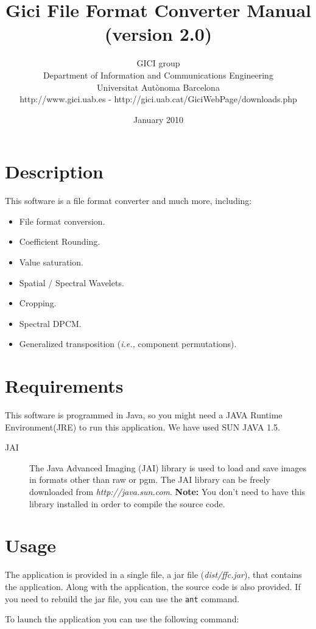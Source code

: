 \documentclass[a4paper,10pt]{article}
\title{Gici File Format Converter Manual \\ \small (version 2.0)}
\author{
GICI group \vspace{0.1cm} \\
\small Department of Information and Communications Engineering \\
\small Universitat Aut{\`o}noma Barcelona \\
\small http://www.gici.uab.es  -  http://gici.uab.cat/GiciWebPage/downloads.php \\
}
\date{January 2010}
\newcommand{\me}{ffc\relax }
\begin{document}
\maketitle

\section{Description}

This software is a file format converter and much more, including:
\begin{itemize}
 \item File format conversion.
 \item Coefficient Rounding.
 \item Value saturation.
 \item Spatial / Spectral Wavelets.
 \item Cropping.
 \item Spectral DPCM.
 \item Generalized transposition (\textit{i.e.,} component permutations).
\end{itemize}

\section{Requirements}

This software is programmed in Java, so you might need a JAVA Runtime Environment(JRE) to run this application.
We have used SUN JAVA 1.5. 

\begin{description}
\item[JAI] The Java Advanced Imaging (JAI) library is used to load and save images in formats
other than raw or pgm. The JAI library can be freely downloaded from \emph{http://java.sun.com}.
\textbf{Note:} You don't need to have this library installed in order to compile the source code.
\end{description}

\section{Usage}

The application is provided in a single file, a jar file (\emph{dist/\me{}.jar}), that contains the application.
Along with the application, the source code is also provided. If you need to rebuild the jar file, you can use the \texttt{ant} command.

To launch the application you can use the following command: 
\end{document}

